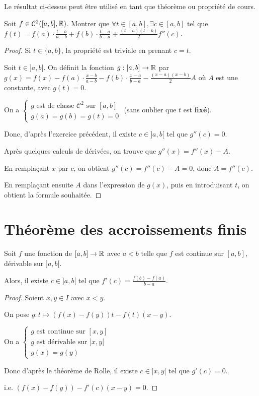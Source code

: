 \documentclass[12pt, a4paper]{report}
\begin{document}
\begin{remark}
  Le résultat ci-dessus peut être utilisé en tant que théorème ou propriété de cours.
\end{remark}

\begin{application}
  Soit $f \in \mathcal{C}^2([a,b],\mathbb{R})$. Montrer que $\forall t \in [a,b], \exists c \in [a,b]$ tel que $f(t)=f(a)\cdot \frac{t-b}{a-b} + f(b)\cdot \frac{t-a}{b-a} + \frac{(t-a)(t-b)}{2} f''(c)$.
\end{application}

\begin{proof}
  Si $t\in\{a,b\}$, la propriété est triviale en prenant $c=t$.

  Soit $t\in ]a,b[$.
  On définit la fonction $g : [a,b] \to \mathbb{R}$ par $g(x) = f(x) - f(a)\cdot \frac{x-b}{a-b} - f(b)\cdot \frac{x-a}{b-a} - \frac{(x-a)(x-b)}{2} A$ où $A$ est une constante, avec $g(t)=0$.

  On a $\begin{cases}
  g \text{ est de classe } \mathcal{C}^2 \text{ sur } [a,b]\\
  g(a) = g(b) = g(t) = 0
  \end{cases}$ (sans oublier que $t$ est \textbf{fixé}).

  Donc, d'après l'exercice précédent, il existe $c \in ]a,b[$ tel que $g''(c) = 0$.

  Après quelques calculs de dérivées, on trouve que $g''(x) = f''(x) - A$.

  En remplaçant $x$ par $c$, on obtient $g''(c) = f''(c) - A = 0$, donc $A = f''(c)$.

  En remplaçant ensuite $A$ dans l'expression de $g(x)$, puis en introduisant $t$, on obtient la formule souhaitée.
\end{proof}

\section{Théorème des accroissements finis}

\begin{theorem}
  Soit $f$ une fonction de $[a,b]\to\mathbb{R}$ avec $a < b$ telle que $f$ est continue sur $[a,b]$, dérivable sur $]a,b[$.

  Alors, il existe $c \in ]a,b[$ tel que $f'(c) = \frac{f(b) - f(a)}{b - a}$.
\end{theorem}

\begin{proof}
  Soient $x,y\in I$ avec $x<y$.

  On pose $g:t\mapsto (f(x)-f(y))t - f(t)(x-y)$.

  On a $\begin{cases}
  g \text{ est continue sur } [x,y]\\
  g \text{ est dérivable sur } ]x,y[\\
  g(x) = g(y)
  \end{cases}$

  Donc d'après le théorème de Rolle, il existe $c\in]x,y[$ tel que $g'(c) = 0$.

  i.e. $(f(x)-f(y)) - f'(c)(x-y) = 0$.
\end{proof}
\end{document}

